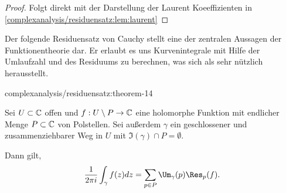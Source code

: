 \begin{proof}
 Folgt direkt mit der Darstellung der Laurent Koeeffizienten in \cref{complexanalysis/residuensatz:lem:laurent} 
\end{proof}

\par
Der folgende Residuensatz von Cauchy stellt eine der zentralen Aussagen der Funktionentheorie dar.
Er erlaubt es uns Kurvenintegrale mit Hilfe der Umlaufzahl und des Residuums zu berechnen, was sich als sehr nützlich herausstellt.
\begin{theorem}{}{complexanalysis/residuensatz:theorem-14}



\par
Sei \(U \subset \mathbb{C}\) offen und \(f:U\setminus P \to \mathbb{C}\) eine holomorphe Funktion mit endlicher Menge \(P \subset \mathbb{C}\) von Polstellen.
Sei außerdem \(\gamma\) ein geschlossener und zusammenziehbarer Weg in \(U\) mit \(\Im(\gamma) \cap P = \emptyset\).

\par
Dann gilt,
\begin{align*}
\frac{1}{2\pi i}\int_\gamma f(z) dz = \sum_{p \in P} \Um_\gamma(p) \Res_{p}(f).
\end{align*}\end{theorem}

